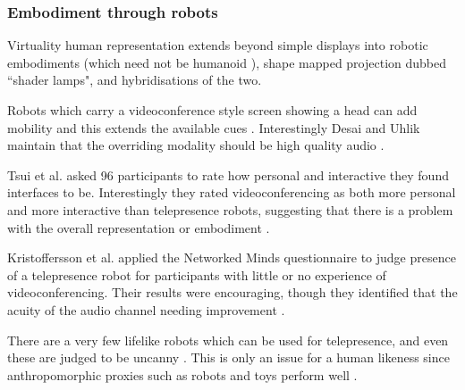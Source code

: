 \subsubsection{Embodiment through robots}
Virtuality human representation extends beyond simple displays into robotic embodiments (which need not be humanoid \cite{Marti2005}), shape mapped projection dubbed ``shader lamps", and hybridisations of the two.\par
Robots which carry a videoconference style screen showing a head can add mobility and this extends the available cues \cite{Adalgeirsson2010, Lee2011, Tsui2011, Paulos1998, Kristoffersson2013}. Interestingly Desai and Uhlik maintain that the overriding modality should be high quality audio \cite{Desai2011}.\par
 Tsui et al. asked 96 participants to rate how personal and interactive they found interfaces to be. Interestingly they rated videoconferencing as both more personal and more interactive than telepresence robots, suggesting that there is a problem with the overall representation or embodiment \cite{Tsui2012}.\par
Kristoffersson et al. applied the Networked Minds questionnaire to judge presence of a telepresence robot for participants with little or no experience of videoconferencing. Their results were encouraging, though they identified that the acuity of the audio channel needing improvement \cite{Kristoffersson2011}.\par
                    There are a very few lifelike robots which can be used for telepresence, and even these are judged to be uncanny \cite{Sakamoto2007}. This is only an issue for a human likeness since anthropomorphic proxies such as robots and toys perform well \cite{Mori1970}.
